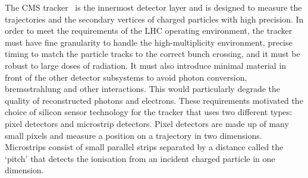 The CMS tracker~\cite{CMSTrackerTDR} is the innermost detector layer and is designed to measure the trajectories and the secondary vertices of charged particles with high precision. 
In order to meet the requirements of the LHC operating environment, the tracker must have fine granularity to handle the high-multiplicity environment, precise timing to match the particle tracks to the correct bunch crossing, and it must be robust to large doses of radiation.
It must also introduce minimal material in front of the other detector subsystems to avoid photon conversion, bremsstrahlung and other interactions. This would particularly degrade the quality of reconstructed photons and electrons. 
These requirements motivated the choice of silicon sensor technology for the tracker that uses two different types: pixel detectors and microstrip detectors. Pixel detectors are made up of many small pixels and measure a position on a trajectory in two dimensions. Microstrips consist of small parallel strips separated by a distance called the `pitch' that detects the ionisation from an incident charged particle in one dimension. 


